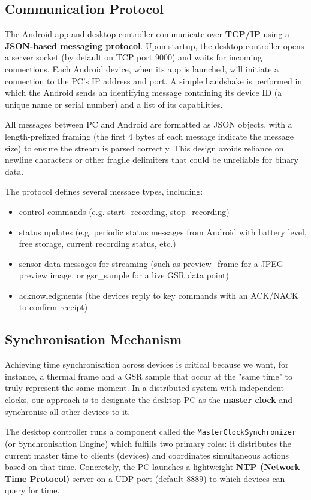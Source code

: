 \subsection{Communication Protocol}

The Android app and desktop controller communicate over \textbf{TCP/IP} using a \textbf{JSON-based messaging protocol}. Upon startup, the desktop controller opens a server socket (by default on TCP port 9000) and waits for incoming connections. Each Android device, when its app is launched, will initiate a connection to the PC's IP address and port. A simple handshake is performed in which the Android sends an identifying message containing its device ID (a unique name or serial number) and a list of its capabilities.

All messages between PC and Android are formatted as JSON objects, with a length-prefixed framing (the first 4 bytes of each message indicate the message size) to ensure the stream is parsed correctly. This design avoids reliance on newline characters or other fragile delimiters that could be unreliable for binary data.

The protocol defines several message types, including:
\begin{itemize}
\item control commands (e.g. start\_recording, stop\_recording)
\item status updates (e.g. periodic status messages from Android with battery level, free storage, current recording status, etc.)
\item sensor data messages for streaming (such as preview\_frame for a JPEG preview image, or gsr\_sample for a live GSR data point)
\item acknowledgments (the devices reply to key commands with an ACK/NACK to confirm receipt)
\end{itemize}

\subsection{Synchronisation Mechanism}

Achieving time synchronisation across devices is critical because we want, for instance, a thermal frame and a GSR sample that occur at the "same time" to truly represent the same moment. In a distributed system with independent clocks, our approach is to designate the desktop PC as the \textbf{master clock} and synchronise all other devices to it.

The desktop controller runs a component called the \texttt{MasterClockSynchronizer} (or Synchronisation Engine) which fulfills two primary roles: it distributes the current master time to clients (devices) and coordinates simultaneous actions based on that time. Concretely, the PC launches a lightweight \textbf{NTP (Network Time Protocol)} server on a UDP port (default 8889) to which devices can query for time.

